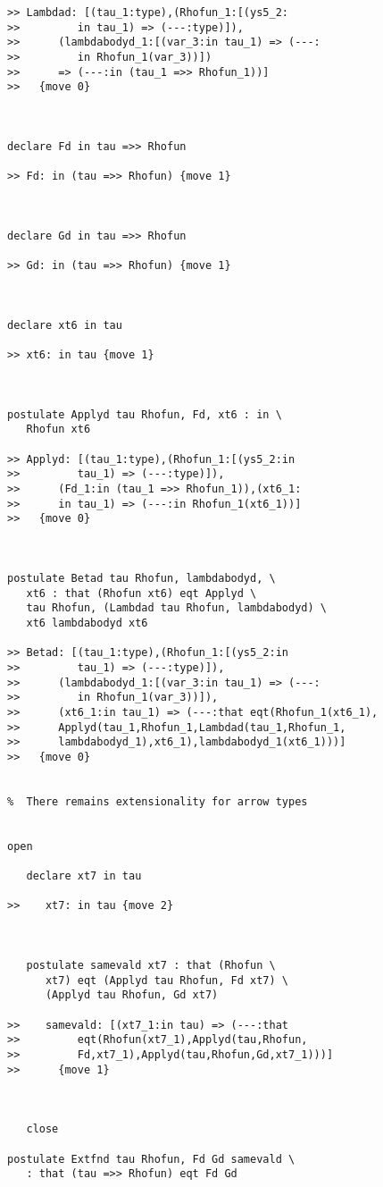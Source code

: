 \documentclass[12pt]{article}
\begin{document}
\begin{verbatim}
>> Lambdad: [(tau_1:type),(Rhofun_1:[(ys5_2:
>>         in tau_1) => (---:type)]),
>>      (lambdabodyd_1:[(var_3:in tau_1) => (---:
>>         in Rhofun_1(var_3))])
>>      => (---:in (tau_1 =>> Rhofun_1))]
>>   {move 0}



declare Fd in tau =>> Rhofun

>> Fd: in (tau =>> Rhofun) {move 1}



declare Gd in tau =>> Rhofun

>> Gd: in (tau =>> Rhofun) {move 1}



declare xt6 in tau

>> xt6: in tau {move 1}



postulate Applyd tau Rhofun, Fd, xt6 : in \
   Rhofun xt6

>> Applyd: [(tau_1:type),(Rhofun_1:[(ys5_2:in
>>         tau_1) => (---:type)]),
>>      (Fd_1:in (tau_1 =>> Rhofun_1)),(xt6_1:
>>      in tau_1) => (---:in Rhofun_1(xt6_1))]
>>   {move 0}



postulate Betad tau Rhofun, lambdabodyd, \
   xt6 : that (Rhofun xt6) eqt Applyd \
   tau Rhofun, (Lambdad tau Rhofun, lambdabodyd) \
   xt6 lambdabodyd xt6

>> Betad: [(tau_1:type),(Rhofun_1:[(ys5_2:in
>>         tau_1) => (---:type)]),
>>      (lambdabodyd_1:[(var_3:in tau_1) => (---:
>>         in Rhofun_1(var_3))]),
>>      (xt6_1:in tau_1) => (---:that eqt(Rhofun_1(xt6_1),
>>      Applyd(tau_1,Rhofun_1,Lambdad(tau_1,Rhofun_1,
>>      lambdabodyd_1),xt6_1),lambdabodyd_1(xt6_1)))]
>>   {move 0}


%  There remains extensionality for arrow types


open

   declare xt7 in tau

>>    xt7: in tau {move 2}



   postulate samevald xt7 : that (Rhofun \
      xt7) eqt (Applyd tau Rhofun, Fd xt7) \
      (Applyd tau Rhofun, Gd xt7)

>>    samevald: [(xt7_1:in tau) => (---:that
>>         eqt(Rhofun(xt7_1),Applyd(tau,Rhofun,
>>         Fd,xt7_1),Applyd(tau,Rhofun,Gd,xt7_1)))]
>>      {move 1}



   close

postulate Extfnd tau Rhofun, Fd Gd samevald \
   : that (tau =>> Rhofun) eqt Fd Gd


\end{verbatim}
\end{document}
